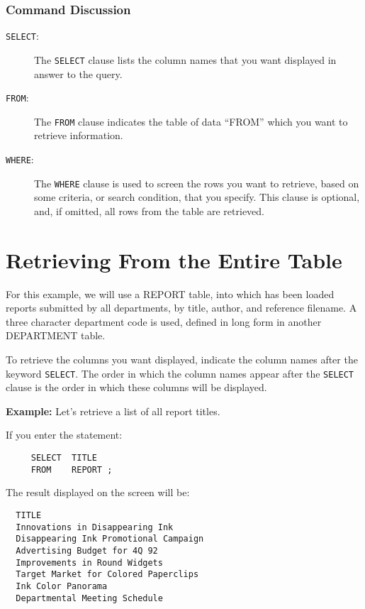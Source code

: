 \subsubsection{Command Discussion}
\begin{description}
\item[\verb`SELECT`:] The \verb`SELECT` clause lists the column names that you want
displayed in answer to the query.

\item[\verb`FROM`:] The \verb`FROM` clause indicates the table of data ``FROM''
which you want to retrieve information.

\item[\verb`WHERE`:] The \verb`WHERE` clause is used to screen the rows you want to
retrieve, based on some criteria, or search condition, that you
specify.  This clause is optional, and, if omitted, all rows from the
table are retrieved.
\end{description}

\section{Retrieving From the Entire Table}

For this example, we will use a REPORT table, into which has been
loaded reports submitted by all departments, by title, author, and
reference filename.  A three character department code is used,
defined in long form in another DEPARTMENT table.

To retrieve the columns you want displayed, indicate the column names
after the keyword \verb`SELECT`.  The order in which the column names appear
after the \verb`SELECT` clause is the order in which these columns will be
displayed.

{\bf Example:}
Let's retrieve a list of all report titles.

If you enter the statement:
\begin{verbatim}
     SELECT  TITLE
     FROM    REPORT ;
\end{verbatim}
The result displayed on the screen will be:
\begin{screen}
\begin{verbatim}
  TITLE
  Innovations in Disappearing Ink
  Disappearing Ink Promotional Campaign
  Advertising Budget for 4Q 92
  Improvements in Round Widgets
  Target Market for Colored Paperclips
  Ink Color Panorama
  Departmental Meeting Schedule
\end{verbatim}
\end{screen}

